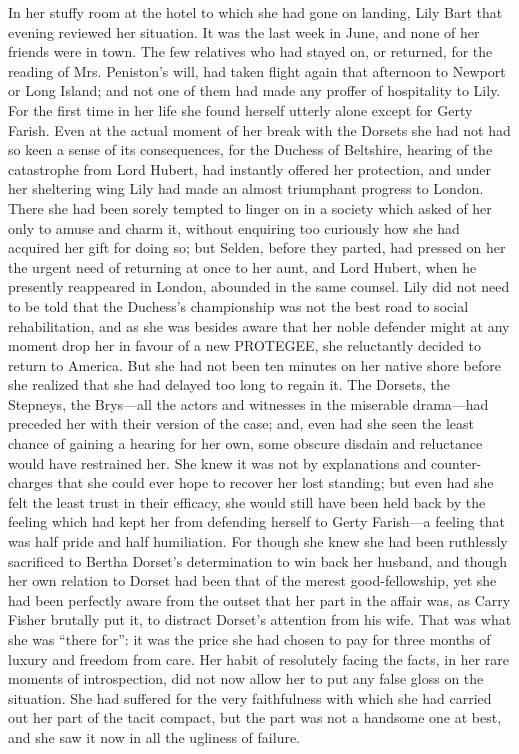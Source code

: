 \documentclass[12pt,a4paper]{book}
\begin{document}
In her stuffy room at the hotel to which she had gone on landing,
Lily Bart that evening reviewed her situation. It was the last
week in June, and none of her friends were in town. The few
relatives who had stayed on, or returned, for the reading of Mrs.
Peniston's will, had taken flight again that afternoon to Newport
or Long Island; and not one of them had made any proffer of
hospitality to Lily. For the first time in her life she found
herself utterly alone except for Gerty Farish. Even at the actual
moment of her break with the Dorsets she had not had so keen a
sense of its consequences, for the Duchess of Beltshire,
hearing of the catastrophe from Lord Hubert, had instantly
offered her protection, and under her sheltering wing Lily had
made an almost triumphant progress to London. There she had been
sorely tempted to linger on in a society which asked of her only
to amuse and charm it, without enquiring too curiously how she
had acquired her gift for doing so; but Selden, before they
parted, had pressed on her the urgent need of returning at once
to her aunt, and Lord Hubert, when he presently reappeared in
London, abounded in the same counsel. Lily did not need to be
told that the Duchess's championship was not the best road to
social rehabilitation, and as she was besides aware that her
noble defender might at any moment drop her in favour of a new
PROTEGEE, she reluctantly decided to return to America. But she
had not been ten minutes on her native shore before she realized
that she had delayed too long to regain it. The Dorsets, the
Stepneys, the Brys---all the actors and witnesses in the miserable
drama---had preceded her with their version of the case; and, even
had she seen the least chance of gaining a hearing for her own,
some obscure disdain and reluctance would have restrained her. 
She knew it was not by explanations and counter-charges that she
could ever hope to recover her lost standing; but even had she
felt the least trust in their efficacy, she would still have been
held back by the feeling which had kept her from defending
herself to Gerty Farish---a feeling that was half pride and half
humiliation. For though she knew she had been ruthlessly
sacrificed to Bertha Dorset's determination to win back her
husband, and though her own relation to Dorset had been that of
the merest good-fellowship, yet she had been perfectly aware from
the outset that her part in the affair was, as Carry Fisher
brutally put it, to distract Dorset's attention from his wife. 
That was what she was ``there for'': it was the price she had
chosen to pay for three months of luxury and freedom from care. 
Her habit of resolutely facing the facts, in her rare moments of
introspection, did not now allow her to put any false gloss on
the situation. She had suffered for the very faithfulness with
which she had carried out her part of the tacit compact, but the
part was not a handsome one at best, and she saw it now in all
the ugliness of failure.
\end{document}
